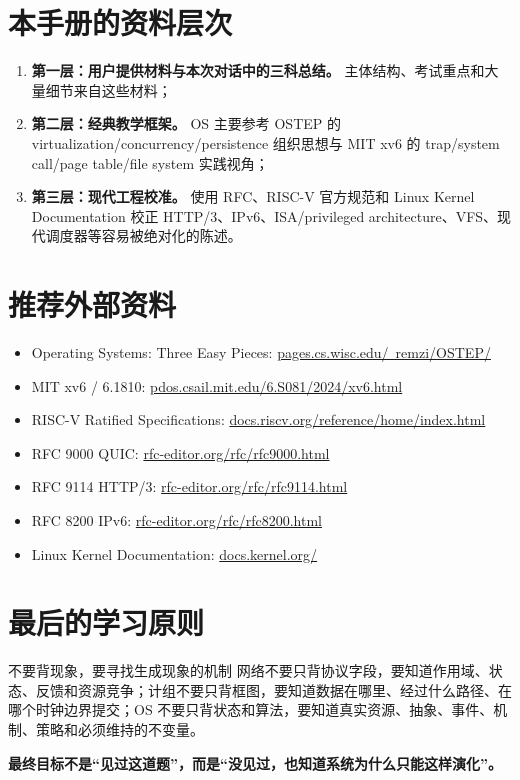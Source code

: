 \documentclass[11pt,a4paper,openany]{ctexbook}
\newcommand{\key}[1]{\textbf{\color{deep}#1}}
\begin{document}
\section{本手册的资料层次}
\begin{enumerate}
  \item \key{第一层：用户提供材料与本次对话中的三科总结。} 主体结构、考试重点和大量细节来自这些材料；
  \item \key{第二层：经典教学框架。} OS 主要参考 OSTEP 的 virtualization/concurrency/persistence 组织思想与 MIT xv6 的 trap/system call/page table/file system 实践视角；
  \item \key{第三层：现代工程校准。} 使用 RFC、RISC-V 官方规范和 Linux Kernel Documentation 校正 HTTP/3、IPv6、ISA/privileged architecture、VFS、现代调度器等容易被绝对化的陈述。
\end{enumerate}

\section{推荐外部资料}
\begin{itemize}
  \item Operating Systems: Three Easy Pieces: \href{https://pages.cs.wisc.edu/~remzi/OSTEP/}{pages.cs.wisc.edu/~remzi/OSTEP/}
  \item MIT xv6 / 6.1810: \href{https://pdos.csail.mit.edu/6.S081/2024/xv6.html}{pdos.csail.mit.edu/6.S081/2024/xv6.html}
  \item RISC-V Ratified Specifications: \href{https://docs.riscv.org/reference/home/index.html}{docs.riscv.org/reference/home/index.html}
  \item RFC 9000 QUIC: \href{https://www.rfc-editor.org/rfc/rfc9000.html}{rfc-editor.org/rfc/rfc9000.html}
  \item RFC 9114 HTTP/3: \href{https://www.rfc-editor.org/rfc/rfc9114.html}{rfc-editor.org/rfc/rfc9114.html}
  \item RFC 8200 IPv6: \href{https://www.rfc-editor.org/rfc/rfc8200.html}{rfc-editor.org/rfc/rfc8200.html}
  \item Linux Kernel Documentation: \href{https://docs.kernel.org/}{docs.kernel.org/}
\end{itemize}

\section{最后的学习原则}
\begin{corebox}{不要背现象，要寻找生成现象的机制}
网络不要只背协议字段，要知道作用域、状态、反馈和资源竞争；计组不要只背框图，要知道数据在哪里、经过什么路径、在哪个时钟边界提交；OS 不要只背状态和算法，要知道真实资源、抽象、事件、机制、策略和必须维持的不变量。
\end{corebox}

\begin{center}
\Large\bfseries\color{deep}
最终目标不是“见过这道题”，而是“没见过，也知道系统为什么只能这样演化”。
\end{center}
\end{document}
